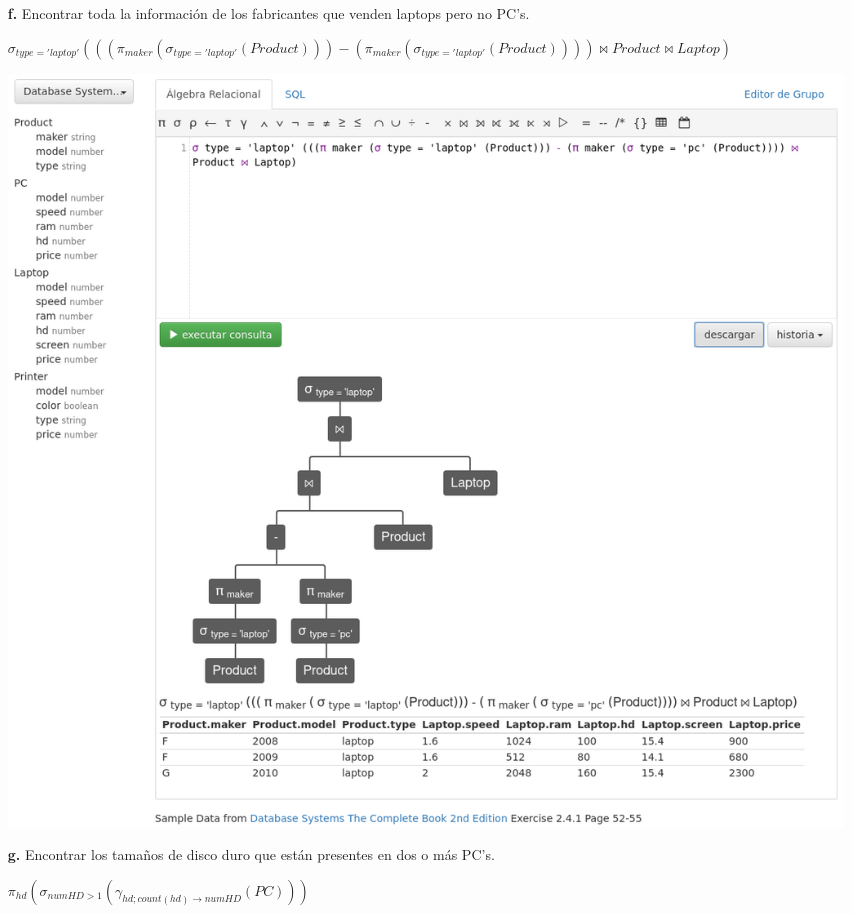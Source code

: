 \documentclass[12pt, letterpaper]{article}
\begin{document}
\begin{itemize}
\begin{itemize}
                \item[\textbf{f.}]  Encontrar toda la información de los fabricantes 
                                    que venden laptops pero no PC's.

                                    \begin{center}
                                        $\sigma_{type='laptop'}(((\pi_{maker}(\sigma_{type='laptop'}(Product))) - (\pi_{maker}(\sigma_{type='laptop'}(Product)))) \Join 
                                        Product \Join Laptop)$ \vspace{.3cm}

                                        \includegraphics[scale=0.26]{f.png}
                                    \end{center}

                \newpage 

                \item[\textbf{g.}]  Encontrar los tamaños de disco duro que están 
                                    presentes en dos o más PC's. 

                                    \begin{center}
                                        $\pi_{hd} (\sigma_{numHD > 1}(\gamma_{hd; count(hd)\rightarrow numHD}(PC)))$\vspace{.3cm}


\end{center}
\end{itemize}
\end{itemize}
\end{document}
